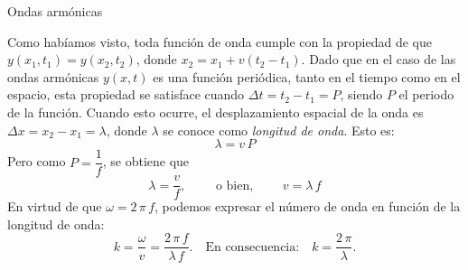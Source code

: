 \documentclass[11pt,handout,aspectratio=1610]{beamer}
\begin{document}
\begin{frame}{Ondas armónicas}

    Como habíamos visto, toda función de onda cumple con la propiedad de que $y(x_1, t_1) = y(x_2, t_2)$, donde $x_2 = x_1 + v \left(t_2-t_1\right)$. Dado que en el caso de las ondas armónicas $y(x,t)$ es una función periódica, tanto en el tiempo como en el espacio, esta propiedad se satisface cuando $\Delta t = t_2 - t_1 = P$, siendo $P$ el periodo de la función. Cuando esto ocurre, el desplazamiento espacial de la onda es $\Delta x = x_2 - x_1 = \lambda$, donde $\lambda$ se conoce como \emph{longitud de onda}. Esto es: $$ \lambda = v \, P$$ Pero como $P = \dfrac{1}{f}$, se obtiene que $$ \lambda = \frac{v}{f}, \qquad \text{ o bien, } \qquad v = \lambda \, f $$ En virtud de que $\omega = 2 \, \pi \, f$, podemos expresar el número de onda en función de la longitud de onda: $$ k = \frac{\omega}{v} = \frac{2 \, \pi \, f}{\lambda \, f}. \quad \text{En consecuencia:} \quad k = \frac{2 \, \pi}{\lambda}. $$ 

            
\end{frame}
\end{document}
